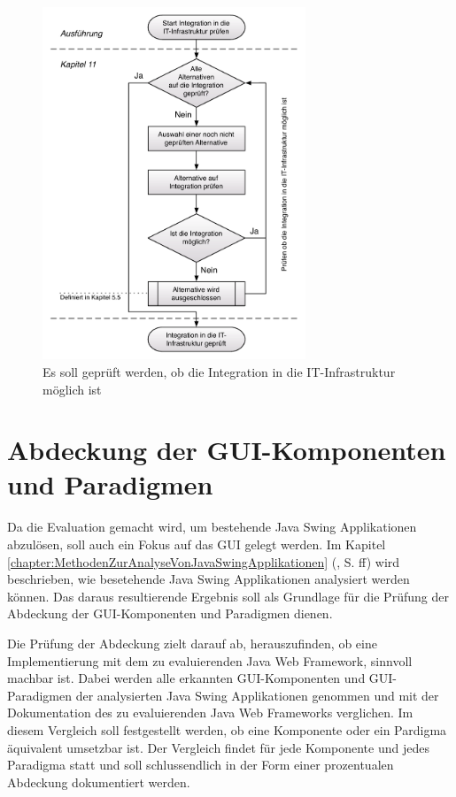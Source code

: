   \clearpage
  
  \begin{figure}[h!]
    \begin{center}
      \includegraphics[width=0.7\textwidth]{./image/integrationPruefen.pdf}
      \caption{Es soll geprüft werden, ob die Integration in die
      IT-Infrastruktur möglich ist}
      \label{img:integrationPruefen}
    \end{center}
  \end{figure}
  
  \section{Abdeckung der GUI-Komponenten und Paradigmen}
  
  Da die Evaluation gemacht wird, um bestehende Java Swing Applikationen
  abzulösen, soll auch ein Fokus auf das \ac{GUI} gelegt werden. Im Kapitel
  \ref{chapter:MethodenZurAnalyseVonJavaSwingApplikationen}
  (, S.
  \pageref{chapter:MethodenZurAnalyseVonJavaSwingApplikationen}ff) wird
  beschrieben, wie besetehende Java Swing Applikationen analysiert werden
  können. Das daraus resultierende Ergebnis soll als Grundlage für die Prüfung
  der Abdeckung der GUI-Komponenten und Paradigmen dienen.
  
  Die Prüfung der Abdeckung zielt darauf ab, herauszufinden, ob eine
  Implementierung mit dem zu evaluierenden Java Web Framework, sinnvoll machbar
  ist. Dabei werden alle erkannten GUI-Komponenten und GUI-Paradigmen der
  analysierten Java Swing Applikationen genommen und mit der Dokumentation des
  zu evaluierenden Java Web Frameworks verglichen. Im diesem Vergleich soll
  festgestellt werden, ob eine Komponente oder ein Pardigma äquivalent
  umsetzbar ist. Der Vergleich findet für jede Komponente und jedes
  Paradigma statt und soll schlussendlich in der Form einer prozentualen
  Abdeckung dokumentiert werden.
  
